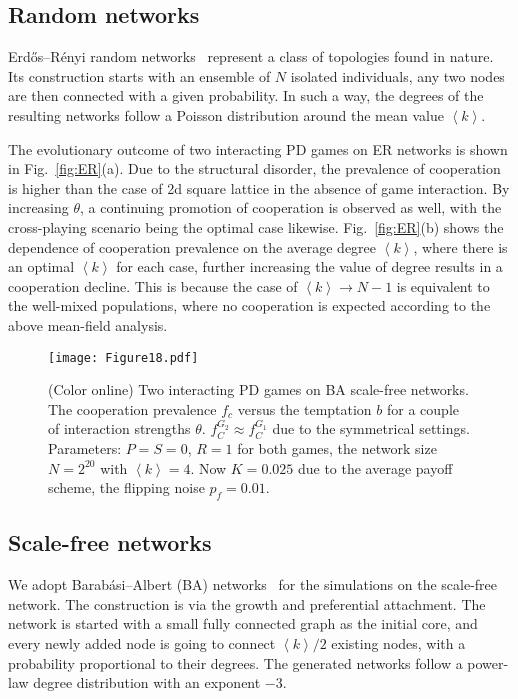 \documentclass[showpacs,superscriptaddress,reprint,nofootinbib,amsmath,amssymb,aps,pre]{revtex4-1}
\begin{document}
\subsection{Random networks}\label{subsec:RN}
Erd\H{o}s--R\'enyi random networks~\cite{Bollobas2001random} represent a class of topologies found in nature. Its construction starts with an ensemble of $N$ isolated individuals, any two nodes are then connected with a given probability. In such a way, the degrees of the resulting networks follow a Poisson distribution around the mean value $\left\langle k\right\rangle$. 

The evolutionary outcome of two interacting PD games on ER networks is shown in Fig.~\ref{fig:ER}(a). Due to the structural disorder, the prevalence of cooperation is higher than the case of 2d square lattice in the absence of game interaction. By increasing $\theta$, a continuing promotion of cooperation is observed as well, with the cross-playing scenario being the optimal case likewise. Fig.~\ref{fig:ER}(b) shows the dependence of cooperation prevalence on the average degree $\left\langle k\right\rangle$, where there is an optimal $\left\langle k\right\rangle$ for each case, further increasing the value of degree results in a cooperation decline.  This is because the case of $\left\langle k\right\rangle\rightarrow N\!-\!1$ is equivalent to the well-mixed populations, where no cooperation is expected according to the above mean-field analysis. 

\begin{figure}[tbp]
\centering
\texttt{[image: Figure18.pdf]}
\caption{(Color online)
Two interacting PD games on BA scale-free networks.
The cooperation prevalence $f_c$ versus the temptation $b$ for a couple of interaction strengths $\theta$. $f^{G_2}_C\approx f^{G_1}_C$ due to the symmetrical settings.
Parameters: $P=S=0$, $R=1$ for both games, the network size $N=2^{20}$ with $\left\langle k\right\rangle=4$. Now $K=0.025$ due to the average payoff scheme, the flipping noise $p_f=0.01$.
}
\label{fig:SF}
\end{figure}

\subsection{Scale-free networks}\label{subsec:SF}
We adopt Barab\'asi--Albert (BA) networks~\cite{Barabasi1999Emergence} for the simulations on the scale-free network. The construction is via the growth and preferential attachment. The network is started with a small fully connected graph as the initial core, and every newly added node is going to connect $\left\langle k\right\rangle /2$ existing nodes, with a probability proportional to their degrees. The generated networks follow a power-law degree distribution with an exponent $-3$.
\end{document}
